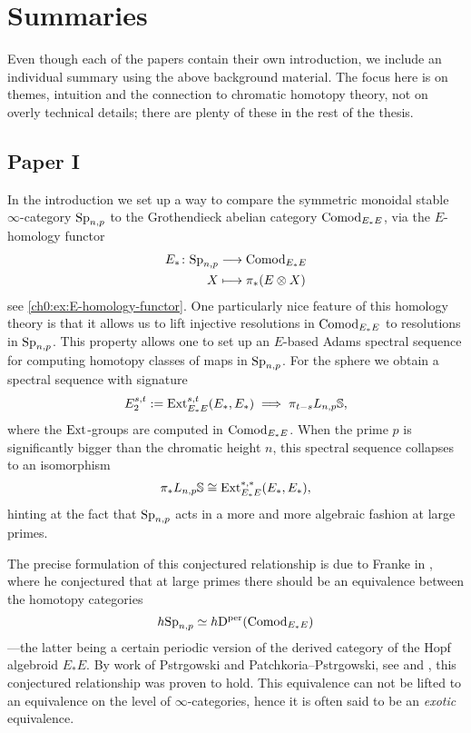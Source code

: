 \section{Summaries}

Even though each of the papers contain their own introduction, we include an individual summary using the above background material. The focus here is on themes, intuition and the connection to chromatic homotopy theory, not on overly technical details; there are plenty of these in the rest of the thesis. 

\subsection{Paper I}

In the introduction we set up a way to compare the symmetric monoidal stable $\infty$-category $\mathrm{Sp}_{n,p}$ to the Grothendieck abelian category $\mathrm{Comod}_{E_*E}$, via the $E$-homology functor
\begin{align*}
    E_*\colon \mathrm{Sp}_{n,p} &\longrightarrow \mathrm{Comod}_{E_*E} \\
    X &\longmapsto \pi_*(E\otimes X)
\end{align*}
see \cref{ch0:ex:E-homology-functor}. One particularly nice feature of this homology theory is that it allows us to lift injective resolutions in $\mathrm{Comod}_{E_*E}$ to resolutions in $\mathrm{Sp}_{n,p}$. This property allows one to set up an $E$-based Adams spectral sequence for computing homotopy classes of maps in $\mathrm{Sp}_{n,p}$. For the sphere we obtain a spectral sequence with signature 
\[E_2^{s,t} := \operatorname{Ext}^{s,t}_{E_*E}(E_*, E_*) \implies \pi_{t-s}L_{n,p} \mathbb{S},\]
where the $\operatorname{Ext}$-groups are computed in $\mathrm{Comod}_{E_*E}$. When the prime $p$ is significantly bigger than the chromatic height $n$, this spectral sequence collapses to an isomorphism 
\[\pi_* L_{n,p} \mathbb{S} \cong \operatorname{Ext}_{E_*E}^{*,*}(E_*, E_*),\] 
hinting at the fact that $\mathrm{Sp}_{n,p}$ acts in a more and more algebraic fashion at large primes. 

The precise formulation of this conjectured relationship is due to Franke in \cite{franke_96}, where he conjectured that at large primes there should be an equivalence between the homotopy categories 
\[h\mathrm{Sp}_{n,p} \simeq h\mathrm{D}^{\mathrm{per}}(\mathrm{Comod}_{E_*E})\]
---the latter being a certain periodic version of the derived category of the Hopf algebroid $E_*E$. By work of Pstr\a{}gowski and Patchkoria--Pstr\a{}gowski, see \cite{pstragowski_2021} and \cite{patchkoria-pstragowski_2021}, this conjectured relationship was proven to hold. This equivalence can not be lifted to an equivalence on the level of $\infty$-categories, hence it is often said to be an \emph{exotic} equivalence. 

